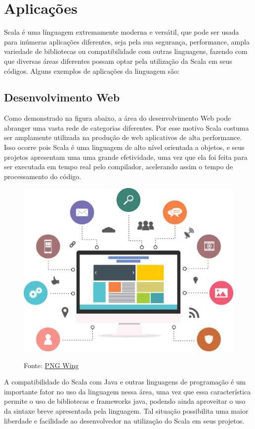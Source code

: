 	\section{Aplicações}
	Scala é uma línguagem extremamente moderna e versátil, que pode ser usada para inúmeras aplicações diferentes, seja pela sua segurança, performance, ampla variedade de bibliotecas ou compatibilidade com outras linguagens, fazendo com que diversas áreas diferentes possam optar pela utilização da Scala em seus códigos. Alguns exemplos de aplicações da linguagem são:
	
		\subsection{Desenvolvimento Web}
		Como demonstrado na figura abaixo, a área do desenvolvimento Web pode abranger uma vasta rede de categorias diferentes. Por esse motivo Scala costuma ser amplamente utilizada na produção de web aplicativos de alta performance. Isso ocorre pois Scala é uma linguagem de alto nível orientada a objetos, e seus projetos apresentam uma uma grande efetividade, uma vez que ela foi feita para ser executada em tempo real pelo compilador, acelerando assim o tempo de processamento do código. 
		
		\begin{figure}[H]
			\centering
			\includegraphics[width=0.7\linewidth]{Pictures/DesenWeb}
			\caption{}
			\label{fig:desenweb}
			Fonte: \href{https://www.pngwing.com/pt}{PNG Wing}
		\end{figure}
		
		A compatibilidade do Scala com Java e outras linguagens de programação é um importante fator no uso da linguagem nessa área, uma vez que essa característica permite o uso de bibliotecas e frameworks java, podendo ainda aproveitar o uso da sintaxe breve apresentada pela linguagem. Tal situação possibilita uma maior liberdade e facilidade ao desenvolvedor na utilização do Scala em seus projetos.
		
